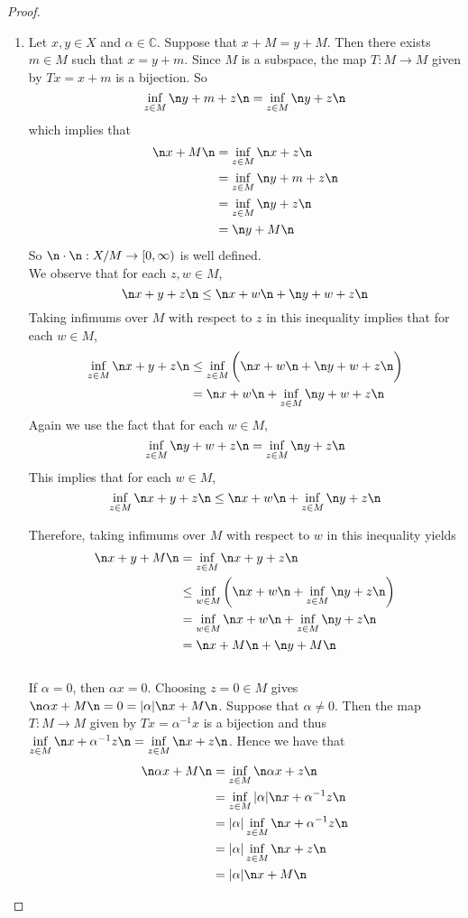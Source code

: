 \documentclass[12pt]{amsart}
\newcommand{\al}{\alpha}
\newcommand{\C}{\mathbb{C}}
\newcommand{\Rg}{[0,\infty)}
\begin{document}
\begin{proof}
	\begin{enumerate}
		\item  Let $x, y \in X$ and $\al \in \C$. Suppose that $x+M =y+M$. Then there exists $m \in M$ such that $x=y+m$. Since $M$ is a subspace, the map $T:M \rightarrow M$ given by $Tx = x+m$ is a bijection. So $$\inf_{z \in M} \n y+m+z \n = \inf_{z \in M} \n y+z \n$$ which implies that 
		\begin{align*}
			\n x +M \n 
			&= \inf_{z \in M} \n x+z \n \\
			&= \inf_{z \in M} \n y+m+z \n \\
			&= \inf_{z \in M} \n y+z \n \\
			&= \n y+M \n
		\end{align*} 
		So $\n \cdot \n: X/M \rightarrow \Rg$ is well defined.\vspace{.5cm}\\
		We observe that for each $z,w \in M$, $$\n x+y+z \n \leq \n x+w \n + \n y+w+z \n$$
		Taking infimums over $M$ with respect to $z$ in this inequality implies that for each $w \in M$,
		\begin{align*}
			\inf_{z \in M}\n x+y+z \n 
			&\leq \inf_{z \in M} \bigg( \n x+w \n + \n y+w+z \n \bigg) \\
			&= \n x+w \n +\inf_{z \in M}\n y+w+z \n
		\end{align*}
		Again we use the fact that for each $w \in M$, $$\inf_{z \in M}\n y+w+z \n = \inf_{z \in M}\n y+z \n$$
		This implies that for each $w \in M$, $$\inf_{z \in M}\n x+y+z \n \leq \n x+w \n + \inf_{z \in M}\n y+z \n$$
		
		Therefore, taking infimums over $M$ with respect to $w$ in this inequality yields
		\begin{align*}
			\n x+y+M \n
			&= \inf_{z \in M} \n x+y +z \n\\
			& \leq \inf_{w \in M} \bigg(\n x+w \n + \inf_{z \in M}\n y+z \n \bigg)\\
			&= \inf_{w \in M} \n x+w \n + \inf_{z \in M}\n y+z \n\\
			&= \n x+M \n + \n y+M \n
		\end{align*}
		\vspace{.5cm}\\
		If $\al =0$, then $\al x = 0$. Choosing $z = 0 \in M$ gives $\n \al x+M \n =0 = \vert \al \vert \n x+M \n $. Suppose that $\al \neq 0$. Then the map $T:M \rightarrow M$ given by $Tx = \al ^{-1}x$ is a bijection and thus $\inf\limits_{z \in M} \n x+\al^{-1}z \n = \inf\limits_{z \in M} \n x+z \n$. Hence we have that
		\begin{align*}
			\n \al x+M \n
			&= \inf_{z \in M} \n \al x +z \n \\
			&= \inf_{z \in M} \vert \al \vert \n x +\al^{-1}z \n \\
			&= \vert \al \vert \inf_{z \in M}\n x +\al^{-1}z \n\\
			&= \vert \al \vert \inf_{z \in M}\n x +z \n \\
			&= \vert \al \vert \n x+M \n
		\end{align*} 
		

\end{enumerate}
\end{proof}
\end{document}
